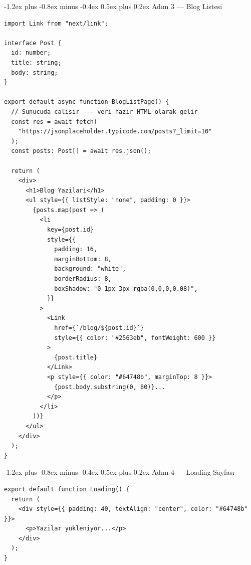 \documentclass[12pt, a4paper]{article}
\makeatletter
\renewcommand{\subsection}{%
  \@startsection{subsection}{2}{\z@}%
    {-1.2ex plus -0.8ex minus -0.4ex}%
    {0.5ex plus 0.2ex}%
    {\normalfont\large\bfseries\sffamily\color{secondary}}%
}
\makeatother
\begin{document}
\subsection{Adım 3 --- Blog Listesi}

\begin{tcolorbox}[enhanced, colback=codebg, colframe=gray!30,
    colbacktitle=ssrcol!85!black, coltitle=white, arc=4pt,
    title={\sffamily\bfseries\small src/app/blog/page.tsx}]
\begin{lstlisting}[style=jsxstyle]
import Link from "next/link";

interface Post {
  id: number;
  title: string;
  body: string;
}

export default async function BlogListPage() {
  // Sunucuda calisir --- veri hazir HTML olarak gelir
  const res = await fetch(
    "https://jsonplaceholder.typicode.com/posts?_limit=10"
  );
  const posts: Post[] = await res.json();

  return (
    <div>
      <h1>Blog Yazilari</h1>
      <ul style={{ listStyle: "none", padding: 0 }}>
        {posts.map(post => (
          <li
            key={post.id}
            style={{
              padding: 16,
              marginBottom: 8,
              background: "white",
              borderRadius: 8,
              boxShadow: "0 1px 3px rgba(0,0,0,0.08)",
            }}
          >
            <Link
              href={`/blog/${post.id}`}
              style={{ color: "#2563eb", fontWeight: 600 }}
            >
              {post.title}
            </Link>
            <p style={{ color: "#64748b", marginTop: 8 }}>
              {post.body.substring(0, 80)}...
            </p>
          </li>
        ))}
      </ul>
    </div>
  );
}
\end{lstlisting}
\end{tcolorbox}

\subsection{Adım 4 --- Loading Sayfası}

\begin{tcolorbox}[enhanced, colback=codebg, colframe=gray!30,
    colbacktitle=warning!85!black, coltitle=white, arc=4pt,
    title={\sffamily\bfseries\small src/app/blog/loading.tsx}]
\begin{lstlisting}[style=jsxstyle]
export default function Loading() {
  return (
    <div style={{ padding: 40, textAlign: "center", color: "#64748b" }}>
      <p>Yazilar yukleniyor...</p>
    </div>
  );
}
\end{lstlisting}
\end{tcolorbox}
\end{document}

